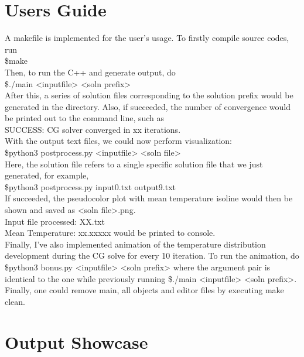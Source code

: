 \documentclass{article}
\begin{document}
\section{Users Guide}
A makefile is implemented for the user's usage. To firstly compile source codes, run \\
{\selectfont \$make} \\
Then, to run the C++ and generate output, do \\
{\selectfont \$./main <inputfile> <soln prefix>} \\
After this, a series of solution files corresponding to the solution prefix would be generated in the directory. Also, if succeeded, the number of convergence would be printed out to the command line, such as \\
{\selectfont SUCCESS: CG solver converged in xx iterations.} \\
With the output text files, we could now perform visualization:\\
{\selectfont \$python3 postprocess.py <inputfile> <soln file>} \\
Here, the solution file refers to a single specific solution file that we just generated, for example, \\
{\selectfont \$python3 postprocess.py input0.txt output9.txt} \\
If succeeded, the pseudocolor plot with mean temperature isoline would then be shown and saved as <soln file>.png. \\
{\selectfont Input file processed: XX.txt} \\
{\selectfont Mean Temperature: xx.xxxxx} would be printed to console. \\
Finally, I've also implemented animation of the temperature distribution development during the CG solve for every 10 iteration. To run the animation, do\\
{\selectfont \$python3 bonus.py <inputfile> <soln prefix>} where the argument pair is identical to the one while previously running {\selectfont \$./main <inputfile> <soln prefix>}. \\
Finally, one could remove {\selectfont main}, all objects and editor files by executing {\selectfont make clean}.



\section{Output Showcase}
\end{document}
